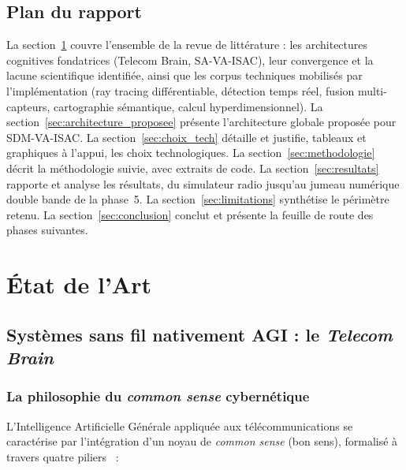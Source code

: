 \documentclass[12pt,a4paper,titlepage]{article}
\begin{document}
\subsection{Plan du rapport}

La section~\ref{sec:etat_art} couvre l'ensemble de la revue de littérature : les architectures cognitives fondatrices (Telecom Brain, SA-VA-ISAC), leur convergence et la lacune scientifique identifiée, ainsi que les corpus techniques mobilisés par l'implémentation (ray tracing différentiable, détection temps réel, fusion multi-capteurs, cartographie sémantique, calcul hyperdimensionnel). La section~\ref{sec:architecture_proposee} présente l'architecture globale proposée pour SDM-VA-ISAC. La section~\ref{sec:choix_tech} détaille et justifie, tableaux et graphiques à l'appui, les choix technologiques. La section~\ref{sec:methodologie} décrit la méthodologie suivie, avec extraits de code. La section~\ref{sec:resultats} rapporte et analyse les résultats, du simulateur radio jusqu'au jumeau numérique double bande de la phase~5. La section~\ref{sec:limitations} synthétise le périmètre retenu. La section~\ref{sec:conclusion} conclut et présente la feuille de route des phases suivantes.

\section{État de l'Art}
\label{sec:etat_art}

\subsection{Systèmes sans fil nativement AGI : le \textit{Telecom Brain}}
\label{subsec:telecom_brain}

\subsubsection{La philosophie du \textit{common sense} cybernétique}

L'Intelligence Artificielle Générale appliquée aux télécommunications se caractérise par l'intégration d'un noyau de \textit{common sense} (bon sens), formalisé à travers quatre piliers~\cite{saad2025} :
\end{document}
